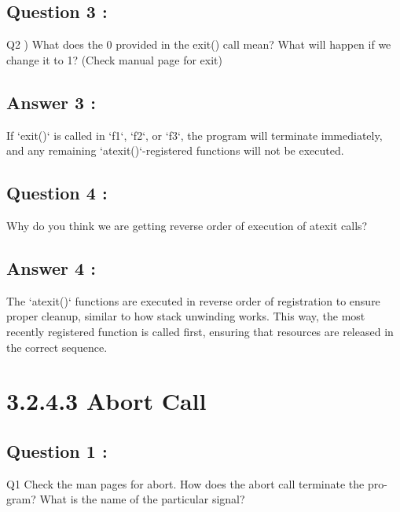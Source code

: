 \documentclass[12pt]{article}
\begin{document}
\subsection{Question 3 :}
Q2 ) What does the 0 provided in the exit() call
mean? What will happen if we change it
to 1? (Check manual page for exit)
\subsection{Answer 3 : }
If `exit()` is called in `f1`, `f2`, or `f3`, the program will terminate immediately, and any remaining `atexit()`-registered functions will not be executed.
\subsection{Question 4 :}
Why do you think we are getting reverse
order of execution of atexit calls?
\subsection{Answer 4 : }
The `atexit()` functions are executed in reverse order of registration to ensure proper cleanup, similar to how stack unwinding works. This way, the most recently registered function is called first, ensuring that resources are released in the correct sequence.

\section{3.2.4.3 Abort Call}
\subsection{Question 1 :}
Q1 Check the man pages for abort. How
does the abort call terminate the pro-gram? What is the name of the particular signal?
\end{document}
